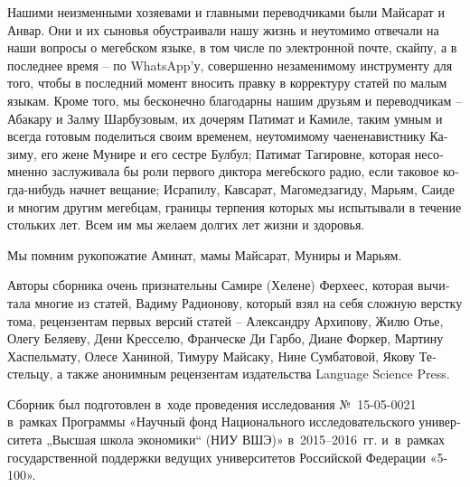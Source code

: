 \begin{russian}
\begin{refsection}
Нашими неизменными хозяевами и главными переводчиками были Майсарат и
Анвар. Они и их сыновья обустраивали нашу жизнь и неутомимо отвечали на
наши вопросы о мегебском языке, в том числе по электронной почте,
скайпу, а в последнее время – по WhatsApp'у, совершенно незаменимому
инструменту для того, чтобы в последний момент вносить правку в
корректуру статей по малым языкам. Кроме того, мы бесконечно благодарны
нашим друзьям и переводчикам – Абакару и Залму Шарбузовым, их дочерям
Патимат и Камиле, таким умным и всегда готовым поделиться своим
временем, неутомимому чаененавистнику Казиму, его жене Мунире и его
сестре Булбул; Патимат Тагировне, которая несомненно заслуживала бы роли
первого диктора мегебского радио, если таковое когда-нибудь начнет
вещание; Исрапилу, Кавсарат, Магомедзагиду, Марьям, Саиде и многим
другим мегебцам, границы терпения которых мы испытывали в течение
стольких лет. Всем им мы желаем долгих лет жизни и здоровья. 

Мы помним рукопожатие Аминат, мамы Майсарат, Муниры и Марьям. 

Авторы сборника очень признательны Самире (Хелене) Ферхеес, которая
вычитала многие из статей, Вадиму Радионову, который взял на себя сложную верстку тома, рецензентам первых версий статей –
Александру Архипову, Жилю Отье, Олегу Беляеву, Дени Кресселю, Франческе
Ди Гарбо, Диане Форкер, Мартину Хаспельмату, Олесе Ханиной, Тимуру
Майсаку, Нине Сумбатовой, Якову Тестельцу, а также анонимным рецензентам
издательства Language Science Press.

Сборник был подготовлен в~ходе проведения исследования №~15-05-0021
в~рамках Программы «Научный фонд Национального исследовательского
университета „Высшая школа экономики“ (НИУ ВШЭ)» в~2015–2016~гг.
и~в~рамках государственной поддержки ведущих университетов Российской
Федерации «5-100».

\medskip
{}
\end{refsection}
\end{russian}

